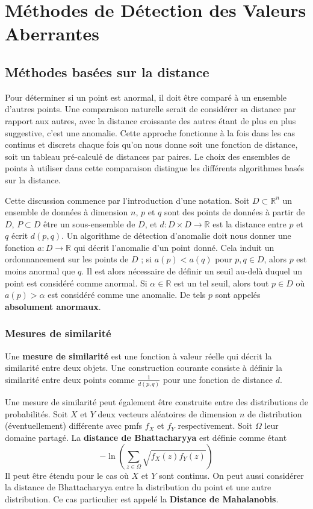\section{Méthodes de Détection des Valeurs Aberrantes}\label{Section:2}
\subsection{Méthodes basées sur la distance}

Pour déterminer si un point est anormal, il doit être comparé à un ensemble d'autres points. 
Une comparaison naturelle serait de considérer sa distance par rapport aux autres,
avec la distance croissante des autres étant de plus en plus suggestive, c'est une anomalie.
Cette approche fonctionne à la fois dans les cas continus et discrets chaque fois qu'on nous donne soit une fonction de distance, soit un tableau pré-calculé de distances par paires.
Le choix des ensembles de points à utiliser dans cette comparaison distingue les différents algorithmes basés sur la distance.

Cette discussion commence par l'introduction d'une notation.
Soit $D \subset \mathbb{R}^n$ un ensemble de données à dimension $n$, 
$p$ et $q$ sont des points de données à partir de $D$, 
$P \subset D$ être un sous-ensemble de $D$, 
et $d : D \times D \to \mathbb{R}$ est la distance entre $p$ et $q$ écrit $d(p,q)$.
Un algorithme de détection d'anomalie doit nous donner une fonction $a : D \to \mathbb{R}$ qui décrit l'anomalie d'un point donné.
Cela induit un ordonnancement sur les points de $D$ ;
si $a(p) < a(q)$ pour $p,q \in D$, alors $p$ est moins anormal que $q$.
Il est alors nécessaire de définir un seuil au-delà duquel un point est considéré comme anormal.
Si $\alpha \in \mathbb{R}$ est un tel seuil, alors tout $p \in D$ où $a(p) > \alpha$ est considéré comme une anomalie.
De tels $p$ sont appelés \textbf{absolument anormaux}.

\subsubsection*{Mesures de similarité}

Une \textbf{mesure de similarité} est une fonction à valeur réelle qui décrit la similarité entre deux objets.
Une construction courante consiste à définir la similarité entre deux points comme $\frac{1}{d(p,q)}$ pour une fonction de distance $d$.

Une mesure de similarité peut également être construite entre des distributions de probabilités.
Soit $X$ et $Y$ deux vecteurs aléatoires de dimension $n$ de distribution (éventuellement) différente avec pmfs $f_X$ et $f_Y$ respectivement.
Soit $\Omega$ leur domaine partagé.
La \textbf{distance de Bhattacharyya } est définie comme étant 
\[
-\ln\left( \sum_{z \in \Omega} \sqrt{f_X(z) f_Y(z)} \right)
\]
Il peut être étendu pour le cas où $X$ et $Y$ sont continus. On peut aussi considérer la distance de Bhattacharyya entre la distribution du point et une autre distribution.
Ce cas particulier est appelé la \textbf{Distance de Mahalanobis}.

